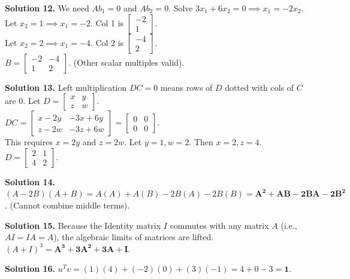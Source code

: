 \documentclass[11pt]{article}
\begin{document}
\vspace{0.2cm}\noindent\textbf{Solution 12.}
We need $Ab_1 = 0$ and $Ab_2 = 0$. Solve $3x_1 + 6x_2 = 0 \implies x_1 = -2x_2$.\\
Let $x_2 = 1 \implies x_1 = -2$. Col 1 is $\begin{bmatrix} -2 \\ 1 \end{bmatrix}$.\\
Let $x_2 = 2 \implies x_1 = -4$. Col 2 is $\begin{bmatrix} -4 \\ 2 \end{bmatrix}$.\\
\textbf{$B = \begin{bmatrix} -2 & -4 \\ 1 & 2 \end{bmatrix}$}. (Other scalar multiples valid).

\vspace{0.2cm}\noindent\textbf{Solution 13.}
Left multiplication $DC=0$ means rows of $D$ dotted with cols of $C$ are 0. Let $D = \begin{bmatrix} x & y \\ z & w \end{bmatrix}$.\\
$DC = \begin{bmatrix} x-2y & -3x+6y \\ z-2w & -3z+6w \end{bmatrix} = \begin{bmatrix} 0 & 0 \\ 0 & 0 \end{bmatrix}$.\\
This requires $x=2y$ and $z=2w$. Let $y=1, w=2$. Then $x=2, z=4$.\\
\textbf{$D = \begin{bmatrix} 2 & 1 \\ 4 & 2 \end{bmatrix}$}.

\vspace{0.2cm}\noindent\textbf{Solution 14.}
$(A - 2B)(A + B) = A(A) + A(B) - 2B(A) - 2B(B) = \mathbf{A^2 + AB - 2BA - 2B^2}$. (Cannot combine middle terms).

\vspace{0.2cm}\noindent\textbf{Solution 15.}
Because the Identity matrix $I$ commutes with any matrix $A$ (i.e., $AI = IA = A$), the algebraic limits of matrices are lifted. $(A+I)^3 = \mathbf{A^3 + 3A^2 + 3A + I}$.

\vspace{0.2cm}\noindent\textbf{Solution 16.}
$u^T v = (1)(4) + (-2)(0) + (3)(-1) = 4 + 0 - 3 = \mathbf{1}$.
\end{document}
